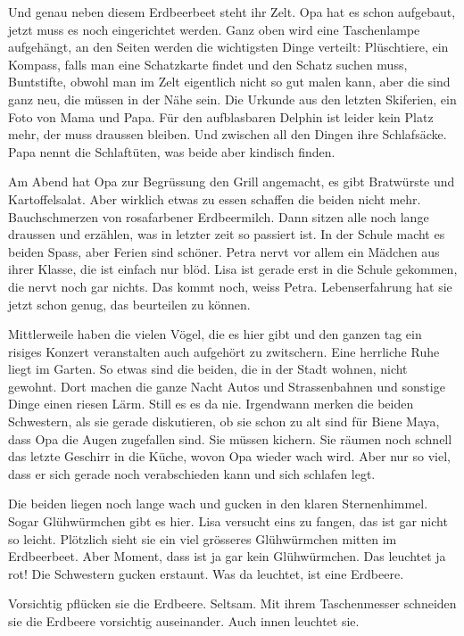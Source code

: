 Und genau neben diesem Erdbeerbeet steht ihr Zelt. Opa hat es schon aufgebaut, jetzt muss es noch eingerichtet werden. Ganz oben wird eine Taschenlampe aufgehängt, an den Seiten werden die wichtigsten Dinge verteilt: Plüschtiere, ein Kompass, falls man eine Schatzkarte findet und den Schatz suchen muss, Buntstifte, obwohl man im Zelt eigentlich nicht so gut malen kann, aber die sind ganz neu, die müssen in der Nähe sein. Die Urkunde aus den letzten Skiferien, ein Foto von Mama und Papa. Für den aufblasbaren Delphin ist leider kein Platz mehr, der muss draussen bleiben. Und zwischen all den Dingen ihre Schlafsäcke. Papa nennt die Schlaftüten, was beide aber kindisch finden.

Am Abend hat Opa zur Begrüssung den Grill angemacht, es gibt Bratwürste und Kartoffelsalat. Aber wirklich etwas zu essen schaffen die beiden nicht mehr. Bauchschmerzen von rosafarbener Erdbeermilch. Dann sitzen alle noch lange draussen und erzählen, was in letzter zeit so passiert ist. In der Schule macht es beiden Spass, aber Ferien sind schöner. Petra nervt vor allem ein Mädchen aus ihrer Klasse, die ist einfach nur blöd. Lisa ist gerade erst in die Schule gekommen, die nervt noch gar nichts. Das kommt noch, weiss Petra. Lebenserfahrung hat sie jetzt schon genug, das beurteilen zu können.

Mittlerweile haben die vielen Vögel, die es hier gibt und den ganzen tag ein risiges Konzert veranstalten auch aufgehört zu zwitschern. Eine herrliche Ruhe liegt im Garten. So etwas sind die beiden, die in der Stadt wohnen, nicht gewohnt. Dort machen die ganze Nacht Autos und Strassenbahnen und sonstige Dinge einen riesen Lärm. Still es es da nie. Irgendwann merken die beiden Schwestern, als sie gerade diskutieren, ob sie schon zu alt sind für Biene Maya, dass Opa die Augen zugefallen sind. Sie müssen kichern. Sie räumen noch schnell das letzte Geschirr in die Küche, wovon Opa wieder wach wird. Aber nur so viel, dass er sich gerade noch verabschieden kann und sich schlafen legt.

Die beiden liegen noch lange wach und gucken in den klaren Sternenhimmel. Sogar Glühwürmchen gibt es hier. Lisa versucht eins zu fangen, das ist gar nicht so leicht. Plötzlich sieht sie ein viel grösseres Glühwürmchen mitten im Erdbeerbeet. Aber Moment, dass ist ja gar kein Glühwürmchen. Das leuchtet ja rot! Die Schwestern gucken erstaunt. Was da leuchtet, ist eine Erdbeere.

Vorsichtig pflücken sie die Erdbeere. Seltsam. Mit ihrem Taschenmesser schneiden sie die Erdbeere vorsichtig auseinander. Auch innen leuchtet sie.

